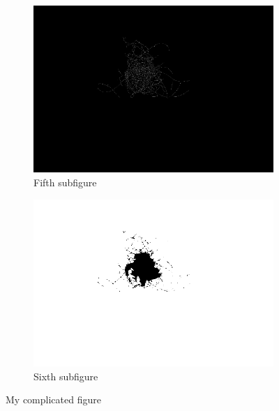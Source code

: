 \documentclass[german,a4paper, 12pt]{scrartcl}
\begin{document}
\begin{figure}[H]
	\medskip
	\begin{subfigure}{0.48\textwidth}
		\includegraphics[width=\linewidth]{figBina/09input intensity.png}
		\caption{Fifth subfigure} \label{fig:e}
	\end{subfigure}\hspace*{\fill}
	\begin{subfigure}{0.48\textwidth}
		\includegraphics[width=\linewidth]{figBina/09outer section.png}
		\caption{Sixth subfigure} \label{fig:f}
	\end{subfigure}
	
	
	\caption{My complicated figure} \label{fig:1}
\end{figure}
\end{document}
